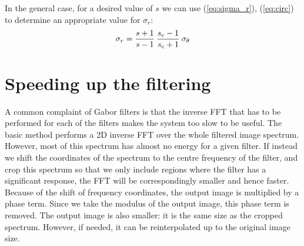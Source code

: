 \documentclass[12pt,a4]{article}
\begin{document}
In the general case, for a desired value of $s$ we can use (\ref{eq:sigma_r}), (\ref{eq:circ}) to determine an appropriate value for $\sigma_r$:
\[ \sigma_r = {s+1 \over s-1}\: {s_c-1 \over s_c+1}\: \sigma_\theta \]


\section{Speeding up the filtering}

A common complaint of Gabor filters is that the inverse FFT that has to be performed for each of the filters makes the system too slow to be useful.   The basic method performs a 2D inverse FFT over the whole filtered image spectrum.  However, most of this spectrum has almost no energy for a given filter.  If instead we shift the coordinates of the spectrum to the centre frequency of the filter, and crop this spectrum so that we only include regions where the filter has a significant response, the FFT will be correspondingly smaller and hence faster.  Because of the shift of frequency coordinates, the output image is multiplied by a phase term.  Since we take the modulus of the output image, this phase term is removed.  The output image is also smaller: it is the same size as the cropped spectrum.  However, if needed, it can be reinterpolated up to the original image size.  
\end{document}
